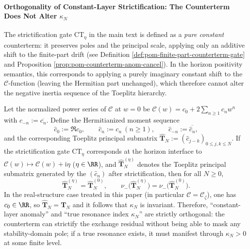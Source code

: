 \paragraph{Orthogonality of Constant-Layer Strictification: The Counterterm Does Not Alter \texorpdfstring{$\kappa_N$}{kappaN}}
The strictification gate \(\mathrm{CT}_\eta\) in the main text is defined as a \emph{pure constant} counterterm: it preserves poles and the principal scale, applying only an additive shift to the finite-part drift (see Definition \ref{def:pom-finite-part-counterterm-gate} and Proposition \ref{prop:pom-counterterm-anom-cancel}).
In the horizon positivity semantics, this corresponds to applying a purely imaginary constant shift to the \(\mathscr{C}\)-function (leaving the Hermitian part unchanged), which therefore cannot alter the negative inertia sequence of the Toeplitz hierarchy.

\begin{theorem}\label{thm:xi-counterterm-invariance-kappa}
Let the normalized power series of \(\mathscr{C}\) at \(w=0\) be
\(
\mathscr{C}(w)=c_0+2\sum_{n\ge 1}c_n w^n
\)
with \(c_{-n}:=\overline{c_n}\).
Define the Hermitianized moment sequence
\[
\widehat c_0:=\Re c_0,\qquad
\widehat c_n:=c_n\ (n\ge 1),\qquad
\widehat c_{-n}:=\overline{\widehat c_n},
\]
and the corresponding Toeplitz principal submatrix
\(
\widehat{\mathbf{T}}_N:=(\widehat c_{j-k})_{0\le j,k\le N}
\).
If the strictification gate \(\mathrm{CT}_\eta\) corresponds at the horizon interface to
\(\mathscr{C}(w)\mapsto \mathscr{C}(w)+\mathrm{i}\eta\) (\(\eta\in\RR\)), and \(\widehat{\mathbf{T}}_N^{(\eta)}\) denotes the Toeplitz principal submatrix generated by the \((\widehat c_n)\) after strictification, then for all \(N\ge 0\),
\begin{equation}\label{eq:xi-counterterm-invariance-kappa}
\boxed{\;
\widehat{\mathbf{T}}_N^{(\eta)}=\widehat{\mathbf{T}}_N^{(0)},
\qquad
\nu_-\!\bigl(\widehat{\mathbf{T}}_N^{(\eta)}\bigr)=\nu_-\!\bigl(\widehat{\mathbf{T}}_N^{(0)}\bigr).\;}
\end{equation}
In the real-structure case treated in this paper (in particular \(\mathscr{C}=\mathscr{C}_{\zeta}\)), one has \(c_0\in\RR\), so \(\widehat{\mathbf{T}}_N=\mathbf{T}_N\) and it follows that \(\kappa_N\) is invariant.
Therefore, ``constant-layer anomaly'' and ``true resonance index \(\kappa_N\)'' are strictly orthogonal: the counterterm can strictify the exchange residual without being able to mask any stability-domain pole; if a true resonance exists, it must manifest through \(\kappa_N>0\) at some finite level.
\end{theorem}

